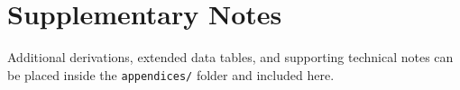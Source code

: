 \section{Supplementary Notes}
\label{app:supplementary}

Additional derivations, extended data tables, and supporting technical notes
can be placed inside the \texttt{appendices/} folder and included here.
